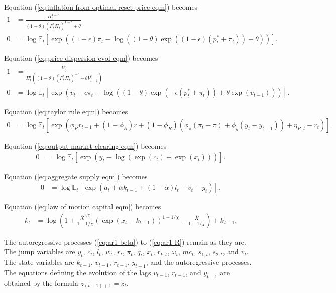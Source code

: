\documentclass[12 pt, oneside]{article}
\theoremstyle{definition}
\theoremstyle{definition}
\theoremstyle{definition}
\newcommand{\E}{\mathbb{E}}
\begin{document}
Equation (\ref{eq:inflation from optimal reset price eqm}) becomes
\begin{align*}
  1 & = \frac{\Pi_t^{1 - \epsilon}}{(1 - \theta)(P_t^*\Pi_t)^{1 - \epsilon} + \theta}\\
  0 & = \log\E_t\left[\exp\left((1 - \epsilon)\pi_t - \log((1 - \theta) \exp((1 - \epsilon)(p_t^* + \pi_t)) + \theta)\right)\right].
\end{align*}

Equation (\ref{eq:price dispersion evol eqm}) becomes
\begin{align*}
  1 & = \frac{V_t^p}{\Pi_t^\epsilon((1 - \theta) (P_t^*\Pi_t)^{-\epsilon} + \theta V_{t - 1}^p)}\\
  0 & = \log\E_t\left[\exp\left(v_t - \epsilon \pi_t - \log((1 - \theta) \exp(-\epsilon(p_t^* + \pi_t)) + \theta \exp(v_{t - 1}))\right)\right].
\end{align*}

Equation (\ref{eq:taylor rule eqm}) becomes
\begin{align*}
  0 & = \log\E_t\left[\exp\left(\phi_R r_{t - 1} + (1 - \phi_R)r + (1 - \phi_R)(\phi_\pi(\pi_t - \pi) + \phi_y(y_t - y_{t - 1})) + \eta_{R, t} - r_t\right)\right].
\end{align*}

Equation (\ref{eq:output market clearing eqm}) becomes
\begin{align*}
  0 & = \log\E_t\left[\exp(y_t - \log(\exp(c_t) + \exp(x_t)))\right].
\end{align*}

Equation (\ref{eq:aggregate supply eqm}) becomes
\begin{align*}
  0 & = \log\E_t\left[\exp(a_t + \alpha k_{t - 1} + (1 - \alpha)l_t - v_t - y_t)\right].
\end{align*}

Equation (\ref{eq:law of motion capital eqm}) becomes
\begin{align*}
  k_t & = \log\left(1 + \frac{\overline{X}^{1 / \chi}}{1 - 1 / \chi}(\exp(x_t - k_{t - 1}))^{1 - 1 / \chi} - \frac{\overline{X}}{1 - 1 / \chi} \right) + k_{t - 1}.
\end{align*}

The autoregressive processes (\ref{eq:ar1 beta}) to (\ref{eq:ar1 R}) remain as they are.\\

The jump variables are $y_t$, $c_t$, $l_t$, $w_t$, $r_t$, $\pi_t$, $q_t$, $x_t$, $r_{k, t}$, $\omega_t$, $mc_t$, $s_{1, t}$, $s_{2, t}$, and $v_t$.
The state variables are $k_{t - 1}$, $v_{t - 1}$, $r_{t - 1}$, $y_{t - 1}$, and the autoregressive processes. The equations defining the evolution of the lags $v_{t - 1}$, $r_{t - 1}$, and $y_{t - 1}$ are obtained by the formula $z_{(t - 1) + 1} = z_t$.
\end{document}
